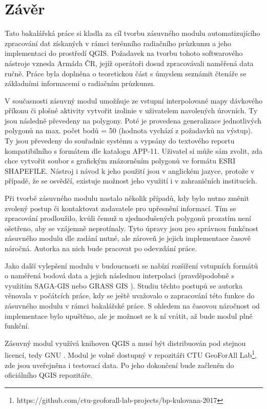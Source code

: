 \chapter{Závěr}
\label{5-zaver}


Tato bakalářská práce si kladla za cíl tvorbu zásuvného modulu automatizujícího zpracování dat získaných v rámci terénního radiačního průzkumu a jeho implementaci do prostředí QGIS. Požadavek na tvorbu tohoto softwarového nástroje vznesla Armáda ČR, jejíž operátoři dosud zpracovávali naměřená data ručně. Práce byla doplněna o teoretickou část s úmyslem seznámit čtenáře se základními informacemi o radiačním průzkumu.

V současnosti zásuvný modul umožňuje ze vstupní interpolované mapy dávkového příkonu či plošné aktivity vytvořit izolinie v uživatelem navolených úrovních. Ty jsou následně převedeny na polygony. Poté je provedena generalizace jednotlivých polygonů na max. počet bodů = 50 (hodnota vychází z požadavků na výstup). Ty jsou převedeny do souřadnic systému  a vypsány do textového reportu kompatibilního s formátem dle katalogu APP-11. Uživatel si může sám zvolit, zda chce vytvořit soubor s grafickým znázorněním polygonů ve formátu ESRI SHAPEFILE. Nástroj i návod k jeho použití jsou v anglickém jazyce, protože v případě, že se osvědčí, existuje možnost jeho využití i v zahraničních institucích.

Při tvorbě zásuvného modulu nastalo několik případů, kdy bylo nutno změnit zvolený postup či kontaktovat zadavatele pro upřesnění informací. Tím se zpracování prodloužilo, kvůli čemuž u zjednodušených polygonů prozatím není ošetřeno, aby se vzájemně neprotínaly. Tyto úpravy jsou pro správnou funkčnost zásuvného modulu dle zadání nutné, ale zároveň je jejich implementace časově náročná. Autorka na nich bude pracovat po odevzdání práce.

Jako další vylepšení modulu v budoucnosti se nabízí rozšíření vstupních formátů o naměřená bodová data a jejich následnou interpolaci (pravděpodobně s využitím SAGA-GIS nebo GRASS GIS ). Studiu těchto postupů se autorka věnovala v počátcích práce, kdy se ještě uvažovalo o zapracování této funkce do zásuvného modulu v rámci bakalářské práce. S ohledem na časovou náročnost od implementace bylo upuštěno, ale je možnost se k ní vrátit, až bude modul plně funkční.

Zásuvný modul využívá knihoven QGIS a musí být distribuován pod stejnou licencí, tedy GNU . Modul je volně dostupný v repozitáři CTU GeoForAll Lab\footnote{https://github.com/ctu-geoforall-lab-projects/bp-kulovana-2017}, zde jsou uveřejněna i testovací data. Po jeho dokončení bude začleněn do oficiálního QGIS repozitáře. 